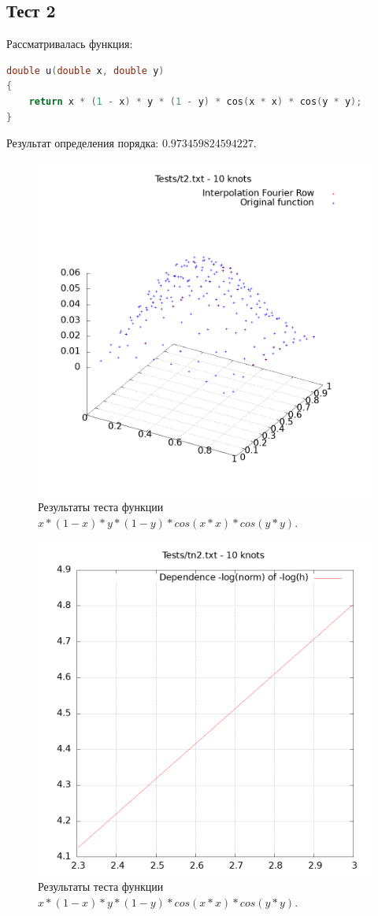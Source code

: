\documentclass[14pt,a4paper]{extarticle}
\newcommand{\1}{\mathbbm{1}}
\begin{document}
\subsection{Тест 2}
Рассматривалась функция:
\begin{lstlisting}[language=c]
    double u(double x, double y)
{
    return x * (1 - x) * y * (1 - y) * cos(x * x) * cos(y * y);
}
    \end{lstlisting}
Результат определения порядка: $0.973459824594227$.
\begin{figure}
    \centering
    \includegraphics[scale=0.5]{Images/t2.txt.png}
    \caption{Результаты теста функции $x * (1 - x) * y * (1 - y) * cos(x * x) * cos(y * y)$.}
\end{figure}

\begin{figure}
    \centering
    \includegraphics[scale=0.5]{Images/tn2.txt.png}
    \caption{Результаты теста функции $x * (1 - x) * y * (1 - y) * cos(x * x) * cos(y * y)$.}
\end{figure}
\end{document}
